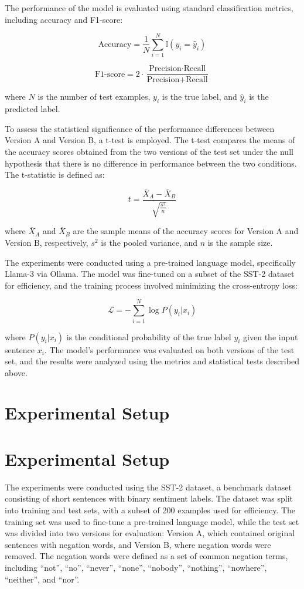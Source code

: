 \documentclass{article}
\begin{document}
The performance of the model is evaluated using standard classification metrics, including accuracy and F1-score:

$$
\text{Accuracy} = \frac{1}{N} \sum_{i=1}^{N} \mathbb{I}(y_i = \hat{y}_i)
$$

$$
\text{F1-score} = 2 \cdot \frac{\text{Precision} \cdot \text{Recall}}{\text{Precision} + \text{Recall}}
$$

where $ N $ is the number of test examples, $ y_i $ is the true label, and $ \hat{y}_i $ is the predicted label. 

To assess the statistical significance of the performance differences between Version A and Version B, a t-test is employed. The t-test compares the means of the accuracy scores obtained from the two versions of the test set under the null hypothesis that there is no difference in performance between the two conditions. The t-statistic is defined as:

$$
t = \frac{\bar{X}_A - \bar{X}_B}{\sqrt{\frac{s^2}{n}}} 
$$

where $ \bar{X}_A $ and $ \bar{X}_B $ are the sample means of the accuracy scores for Version A and Version B, respectively, $ s^2 $ is the pooled variance, and $ n $ is the sample size.

The experiments were conducted using a pre-trained language model, specifically Llama-3 via Ollama. The model was fine-tuned on a subset of the SST-2 dataset for efficiency, and the training process involved minimizing the cross-entropy loss:

$$
\mathcal{L} = -\sum_{i=1}^{N} \log P(y_i | x_i)
$$

where $ P(y_i | x_i) $ is the conditional probability of the true label $ y_i $ given the input sentence $ x_i $. The model's performance was evaluated on both versions of the test set, and the results were analyzed using the metrics and statistical tests described above.
\section{Experimental Setup}
\section{Experimental Setup}

The experiments were conducted using the SST-2 dataset, a benchmark dataset consisting of short sentences with binary sentiment labels. The dataset was split into training and test sets, with a subset of 200 examples used for efficiency. The training set was used to fine-tune a pre-trained language model, while the test set was divided into two versions for evaluation: Version A, which contained original sentences with negation words, and Version B, where negation words were removed. The negation words were defined as a set of common negation terms, including ``not'', ``no'', ``never'', ``none'', ``nobody'', ``nothing'', ``nowhere'', ``neither'', and ``nor''. 
\end{document}
